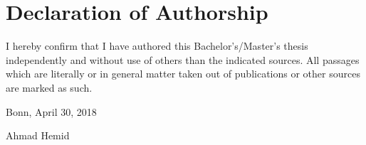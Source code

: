 
\section*{Declaration of Authorship}

I hereby confirm that I have authored this Bachelor's/Master's
thesis independently and without use of others than the indicated
sources. All passages which are literally or in general matter
taken out of publications or other sources are marked as such.
\vspace{1cm}

Bonn, April 30, 2018 \vspace{0.5cm}

Ahmad Hemid
